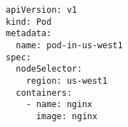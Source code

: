 \begin{verbatim}
apiVersion: v1
kind: Pod
metadata:
  name: pod-in-us-west1
spec:
  nodeSelector:
    region: us-west1
  containers:
    - name: nginx
      image: nginx
\end{verbatim}